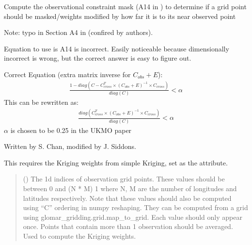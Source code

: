 \documentclass[letterpaper,10pt,english]{sphinxmanual}
\begin{document}
\begin{fulllineitems}
\begin{quote}
\begin{description}
\end{description}\end{quote}

\begin{fulllineitems}
\label{\detokenize{kriging:glomar_gridding.stochastic.StochasticKriging.constraint_mask}}
\pysigstartsignatures
\pysiglinewithargsret
{}
{}
{}
\pysigstopsignatures
\sphinxAtStartPar
Compute the observational constraint mask (A14 in ) to
determine if a grid point should be masked/weights modified by how far
it is to its near observed point

\sphinxAtStartPar
Note: typo in Section A4 in  (confired by authors).

\sphinxAtStartPar
Equation to use is A14 is incorrect. Easily noticeable because
dimensionally incorrect is wrong, but the correct answer is easy to
figure out.

\sphinxAtStartPar
Correct Equation (extra matrix inverse for \(C_{obs} + E\)):
\begin{equation*}
\begin{split}\frac{
    1 - diag(C - C_{cross}^T \times (C_{obs} + E)^{-1}
             \times C_{cross})
}{diag(C)} < \alpha\end{split}
\end{equation*}
\sphinxAtStartPar
This can be re\sphinxhyphen{}written as:
\begin{equation*}
\begin{split}\frac{diag(C_{cross}^T \times (C_{obs} + E)^{-1} \times C_{cross})}
{diag(C)} < \alpha\end{split}
\end{equation*}
\sphinxAtStartPar
\(\alpha\) is chosen to be 0.25 in the UKMO paper

\sphinxAtStartPar
Written by S. Chan, modified by J. Siddons.

\sphinxAtStartPar
This requires the Kriging weights from simple Kriging, set as the
 attribute.
\begin{quote}\begin{description}
\sphinxAtStartPar
{} () \textendash{} The 1d indices of observation grid points. These values should be
between 0 and (N * M) \sphinxhyphen{} 1 where N, M are the number of longitudes
and latitudes respectively. Note that these values should also be
computed using “C” ordering in numpy reshaping. They can be
computed from a grid using glomar\_gridding.grid.map\_to\_grid. Each
value should only appear once. Points that contain more than 1
observation should be averaged. Used to compute the Kriging weights.


\end{description}
\end{quote}
\end{fulllineitems}
\end{fulllineitems}
\end{document}
